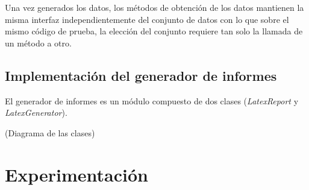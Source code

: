 \documentclass[10pt,a4paper]{report}
\begin{document}
Una vez generados los datos, los métodos de obtención de los datos mantienen la misma interfaz independientemente del conjunto de datos con lo que sobre el mismo código de prueba, la elección del conjunto requiere tan solo la llamada de un método a otro.

\section{Implementación del generador de informes}
El generador de informes es un módulo compuesto de dos clases (\textit{LatexReport} y \textit{LatexGenerator}). 

(Diagrama de las clases)




\chapter{Experimentación}





\end{document}
